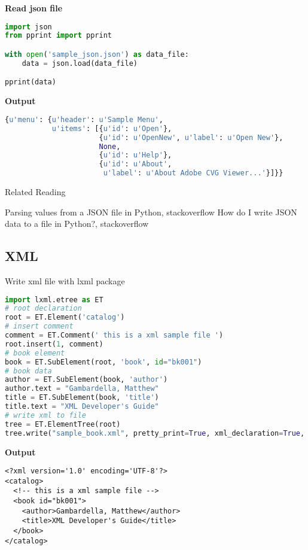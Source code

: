 \textbf{Read json file}

\begin{lstlisting}[language=Python]
import json
from pprint import pprint

with open('sample_json.json') as data_file:
    data = json.load(data_file)

pprint(data)
\end{lstlisting}


\textbf{Output}

\begin{lstlisting}[language=Python]
{u'menu': {u'header': u'Sample Menu',
           u'items': [{u'id': u'Open'},
                      {u'id': u'OpenNew', u'label': u'Open New'},
                      None,
                      {u'id': u'Help'},
                      {u'id': u'About',
                       u'label': u'About Adobe CVG Viewer...'}]}}
\end{lstlisting}

Related Reading

Parsing values from a JSON file in Python, stackoverflow
How do I write JSON data to a file in Python?, stackoverflow

\subsection{XML}

Write xml file with lxml package

\begin{lstlisting}[language=Python]
import lxml.etree as ET
# root declaration
root = ET.Element('catalog')
# insert comment
comment = ET.Comment(' this is a xml sample file ')
root.insert(1, comment)
# book element
book = ET.SubElement(root, 'book', id="bk001")
# book data
author = ET.SubElement(book, 'author')
author.text = "Gambardella, Matthew"
title = ET.SubElement(book, 'title')
title.text = "XML Developer's Guide"
# write xml to file
tree = ET.ElementTree(root)
tree.write("sample_book.xml", pretty_print=True, xml_declaration=True, encoding='utf-8')
\end{lstlisting}

\textbf{Output}

\begin{lstlisting}
<?xml version='1.0' encoding='UTF-8'?>
<catalog>
  <!-- this is a xml sample file -->
  <book id="bk001">
    <author>Gambardella, Matthew</author>
    <title>XML Developer's Guide</title>
  </book>
</catalog>
\end{lstlisting}


